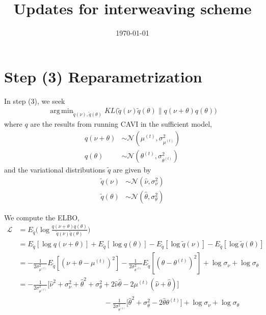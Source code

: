 \documentclass[10pt]{article}
\theoremstyle{plain}
\theoremstyle{definition}
\newcommand{\<}{\langle}
\renewcommand{\>}{\rangle}
\DeclareMathOperator*{\argmin}{arg\,min}
\begin{document}
%

\title{Updates for interweaving scheme}


\date{\today}

\maketitle
 


\setcounter{section}{0}
\section{Step (3) Reparametrization}

In step (3), we seek
\begin{align}
\argmin_{\tilde q(\nu), \tilde q(\theta)} KL\Big(\tilde q(\nu) \tilde q(\theta) \| q(\nu+\theta)q(\theta)\Big)
\end{align}
where $q$ are the results from running CAVI in the sufficient model,
\begin{align*}
q(\nu+\theta) &\sim \mathcal N(\mu^{(t)}, \sigma^2_{\mu^{(t)}})\\
q(\theta) &\sim \mathcal N(\theta^{(t)}, \sigma^2_{\theta^{(t)}})
\end{align*}
and the variational distributions $\tilde q$ are given by
\begin{align}
\tilde q(\nu) &\sim \mathcal N(\hat \nu, \sigma^2_\nu)\\
\tilde q(\theta) &\sim \mathcal N(\hat \theta, \sigma^2_{\theta})
\end{align}

We compute the ELBO,
\begin{align}
\mathcal L &= E_{\tilde q} \Big(\log \frac{q(\nu+\theta)q(\theta)}{\tilde q(\nu) \tilde q(\theta)}\Big)\\
	&= E_{\tilde q}[\log q(\nu+\theta)] + E_{\tilde q}[\log q(\theta)] - E_{\tilde q}[\log \tilde q(\nu)] - E_{\tilde q}[\log \tilde q(\theta)] \\
	&= -\frac{1}{2\sigma^2_{\mu^{(t)}}} E_{\tilde q}[(\nu+\theta - \mu^{(t)})^2] 
	 - \frac{1}{2\sigma^2_{\theta^{(t)}}} E_{\tilde q}[(\theta - \theta^{(t)})^2]
	 + \log \sigma_\nu + \log\sigma_\theta\\
	 &= -\frac{1}{2\sigma^2_{\mu^{(t)}}} \Big[\hat \nu^2 + \sigma^2_\nu + \hat\theta^2 + \sigma^2_\theta + 2\hat\nu\hat\theta - 2\mu^{(t)}(\hat\nu+\hat\theta)\Big]\\
	 &\quad \quad \quad \quad \quad \quad \quad \quad \quad \quad \quad \quad 
	  - \frac{1}{2\sigma^2_{\theta^{(t)}}} \Big[\hat\theta^2 + \sigma^2_\theta  - 2\hat\theta\theta^{(t)} \Big]
	 + \log \sigma_\nu + \log\sigma_\theta\\
\end{align}
\end{document}
